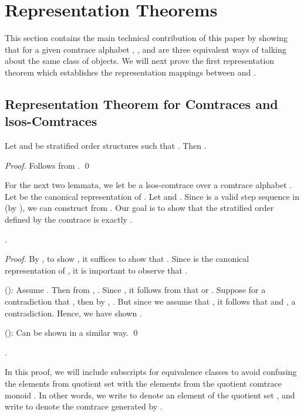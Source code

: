 \documentclass{llncs}
\begin{document}
\section{Representation Theorems \label{sec:representation}}
This section contains the main technical contribution of this paper by showing that for a given comtrace alphabet , ,  and  are three equivalent ways of talking about the same class of objects. We will next prove the first representation theorem which establishes the representation mappings between  and .

\subsection{Representation Theorem for Comtraces and lsos-Comtraces}
\begin{proposition}
Let  and  be stratified order structures such that . Then .
\label{prop:stratsubset}
\end{proposition}
\begin{proof} Follows from . \qed
\end{proof}

For the next two lemmata, we let  be a lsos-comtrace over a comtrace alphabet . Let  be the canonical representation of . Let  and . Since  is a valid step sequence in  (by ), we can construct  from . Our goal is to show that the stratified order  defined by the comtrace  is exactly .

\begin{lemma} .
\label{lem:l1}
\end{lemma}
\begin{proof} By , to show , it suffices to show that . Since  is the canonical representation of , it is important to observe that .

(): Assume . Then from , . Since , it follows from  that   or .  Suppose for a contradiction that , then by ,  . But since we assume that , it follows that  and , a contradiction. Hence, we have shown .

():  Can be shown in a similar way.
\qed
\end{proof}





\begin{lemma} .
\label{lem:l2}
\end{lemma}

In this proof, we will include subscripts for equivalence classes to avoid confusing the elements from quotient set  with the elements from the quotient comtrace monoid . In other words, we write  to denote an element of the quotient set , and write  to denote the comtrace generated by . 
\end{document}
